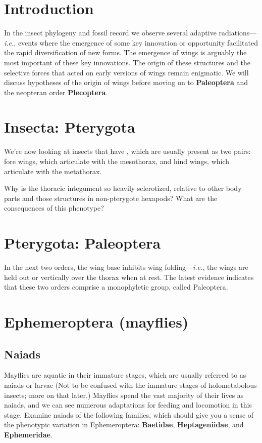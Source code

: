 \section*{Introduction}
In the insect phylogeny and fossil record we observe several adaptive radiations---\textit{i.e.}, events where the emergence of some key innovation or opportunity facilitated the rapid diversification of new forms. The emergence of wings is arguably the most important of these key innovations. The origin of these structures and the selective forces that acted on early versions of wings remain enigmatic. We will discuss hypotheses of the origin of wings before moving on to \textbf{Paleoptera} and the neopteran order \textbf{Plecoptera}.

\section*{Insecta: Pterygota}
We're now looking at insects that have , which are usually present as two pairs: fore wings, which articulate with the mesothorax, and hind wings, which articulate with the metathorax.\vspace{3mm}

\begin{theo}
{}Why is the thoracic integument so heavily sclerotized, relative to other body parts and those structures in non-pterygote hexapods? What are the consequences of this phenotype?
\end{theo}

\section*{Pterygota: Paleoptera}
In the next two orders, the wing base inhibits wing folding---\textit{i.e.}, the wings are held out or vertically over the thorax when at rest. The latest evidence indicates that these two orders comprise a monophyletic group, called Paleoptera.

\section{Ephemeroptera (mayflies)}%

\subsection{Naiads}
Mayflies are aquatic in their immature stages, which are usually referred to as naiads or larvae (Not to be confused with the immature stages of holometabolous insects; more on that later.) Mayflies spend the vast majority of their lives as naiads, and we can see numerous adaptations for feeding and locomotion in this stage. Examine naiads of the following families, which should give you a sense of the phenotypic variation in Ephemeroptera: \textbf{Baetidae}, \textbf{Heptageniidae}, and \textbf{Ephemeridae}.\\

